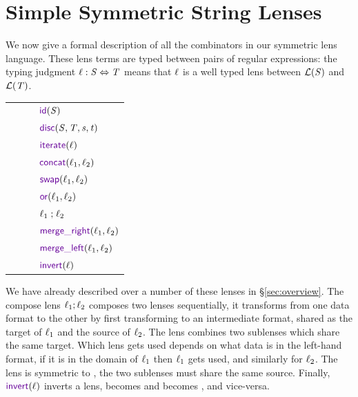 \documentclass[acmsmall,screen,anonymous]{acmart}
\begin{document}

\section{Simple Symmetric String Lenses}
\label{sec:ssl}
We now give a formal description of all the combinators in our symmetric lens
language. These lens terms are typed between pairs of regular expressions: the
typing judgment $\mathit{\ell} : \mathit{S} \Leftrightarrow \mathit{T}$ means that
$\mathit{\ell}$ is a well typed lens between $\mathcal{L}(\mathit{S})$ and
$\mathcal{L}(\mathit{T})$.

\begin{center}
  \begin{tabular}{l@{\ }l@{\ }l@{\ }l}
    \Lens{} & \GEq{} & & $\IdentityLensOf{\Regex}$\\
            & & \GBar{} & $\DisconnectOf{\Regex}{\RegexAlt}{\String}{\StringAlt}$ \\
            & & \GBar{} & $\IterateLensOf{\Lens}$ \\
            & & \GBar{} & $\ConcatLensOf{\Lens_1}{\Lens_2}$ \\
            & & \GBar{} & $\SwapLensOf{\Lens_1}{\Lens_2}$ \\
            & & \GBar{} & $\OrLensOf{\Lens_1}{\Lens_2}$ \\
            & & \GBar{} & $\mathit{\ell}_1\mathrel{;}\mathit{\ell}_2$ \\
            & & \GBar{} & $\MergeROf{\Lens_1}{\Lens_2}$ \\
            & & \GBar{} & $\MergeLOf{\Lens_1}{\Lens_2}$ \\
            & & \GBar{} & $\InvertOf{\Lens}$ \\
  \end{tabular}
\end{center}

We have already described over a number of these lenses in \S\ref{sec:overview}.
The compose lens $\mathit{\ell}_1 ; \mathit{\ell}_2$ composes two lenses sequentially, it
transforms from one data format to the other by first transforming to an
intermediate format, shared as the target of $\mathit{\ell}_1$ and the source of
$\mathit{\ell}_2$. The \MergeR lens combines two sublenses which share the same target.
Which lens gets used depends on what data is in the left-hand format, if it is
in the domain of $\mathit{\ell}_1$ then $\mathit{\ell}_1$ gets used, and similarly for
$\mathit{\ell}_2$.  The \MergeL lens is symmetric to \MergeR, the two sublenses must
share the same source. Finally, $\InvertOf{\Lens}$ inverts a lens, \CreateR
becomes \CreateL and \PutR becomes \PutL, and vice-versa.
\end{document}
